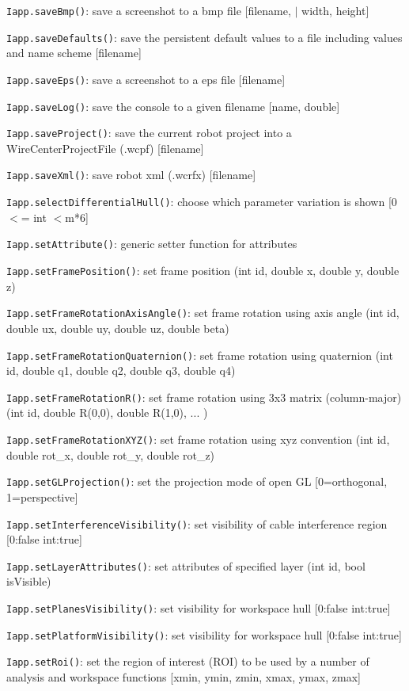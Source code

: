 \documentclass[11pt,a4paper,onepage,openany]{book}
\begin{document}
\texttt{Iapp.saveBmp()}: save a screenshot to a bmp file [filename, $|$ width,
height]

\texttt{Iapp.saveDefaults()}: save the persistent default values to a file
including values and name scheme [filename]

\texttt{Iapp.saveEps()}: save a screenshot to a eps file [filename]

\texttt{Iapp.saveLog()}: save the console to a given filename [name, double]

\texttt{Iapp.saveProject()}: save the current robot project into a
WireCenterProjectFile (.wcpf) [filename]

\texttt{Iapp.saveXml()}: save robot xml (.wcrfx) [filename]

\texttt{Iapp.selectDifferentialHull()}: choose which parameter variation is
shown [0 $<$= int $<$m*6]

\texttt{Iapp.setAttribute()}: generic setter function for attributes

\texttt{Iapp.setFramePosition()}: set frame position (int id, double x, double
y, double z)

\texttt{Iapp.setFrameRotationAxisAngle()}: set frame rotation using axis angle
(int id, double ux, double uy, double uz, double beta)

\texttt{Iapp.setFrameRotationQuaternion()}: set frame rotation using quaternion
(int id, double q1, double q2, double q3, double q4)

\texttt{Iapp.setFrameRotationR()}: set frame rotation using 3x3 matrix
(column-major) (int id, double R(0,0), double R(1,0), ... )

\texttt{Iapp.setFrameRotationXYZ()}: set frame rotation using xyz convention
(int id, double rot\_x, double rot\_y, double rot\_z)

\texttt{Iapp.setGLProjection()}: set the projection mode of open GL
[0=orthogonal, 1=perspective]

\texttt{Iapp.setInterferenceVisibility()}: set visibility of cable interference
region [0:false int:true]

\texttt{Iapp.setLayerAttributes()}: set attributes of specified layer (int id,
bool isVisible)

\texttt{Iapp.setPlanesVisibility()}: set visibility for workspace hull [0:false
int:true]

\texttt{Iapp.setPlatformVisibility()}: set visibility for workspace hull
[0:false int:true]

\texttt{Iapp.setRoi()}: set the region of interest (ROI) to be used by a number
of analysis and workspace functions [xmin, ymin, zmin, xmax, ymax, zmax]
\end{document}
